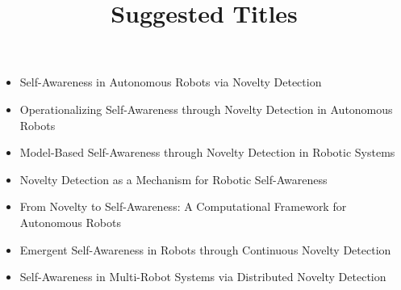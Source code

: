 \documentclass[a4paper]{article}
\title{Suggested Titles}
\date{}
\begin{document}
    \maketitle
    \begin{itemize}
        \item Self-Awareness in Autonomous Robots via Novelty Detection
        \item Operationalizing Self-Awareness through Novelty Detection in Autonomous Robots
        \item Model-Based Self-Awareness through Novelty Detection in Robotic Systems
        \item Novelty Detection as a Mechanism for Robotic Self-Awareness
        \item From Novelty to Self-Awareness: A Computational Framework for Autonomous Robots
        \item Emergent Self-Awareness in Robots through Continuous Novelty Detection
        \item Self-Awareness in Multi-Robot Systems via Distributed Novelty Detection
    \end{itemize}
\end{document}
